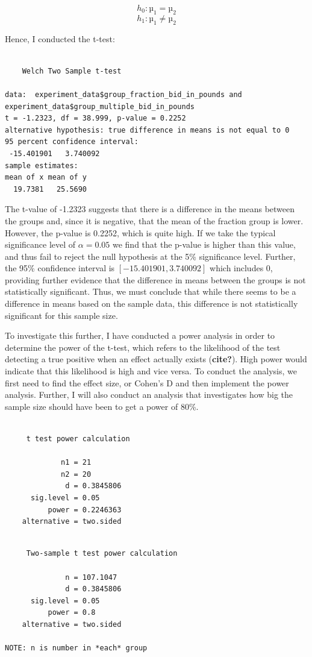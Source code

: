 \documentclass[
]{report}
\begin{document}
\[h_0: µ_1 = µ_2\] \[h_1: µ_1 ≠ µ_2\]

Hence, I conducted the t-test:

\begin{verbatim}

    Welch Two Sample t-test

data:  experiment_data$group_fraction_bid_in_pounds and experiment_data$group_multiple_bid_in_pounds
t = -1.2323, df = 38.999, p-value = 0.2252
alternative hypothesis: true difference in means is not equal to 0
95 percent confidence interval:
 -15.401901   3.740092
sample estimates:
mean of x mean of y 
  19.7381   25.5690 
\end{verbatim}

The t-value of -1.2323 suggests that there is a difference in the means
between the groups and, since it is negative, that the mean of the
fraction group is lower. However, the p-value is 0.2252, which is quite
high. If we take the typical significance level of \(α = 0.05\) we find
that the p-value is higher than this value, and thus fail to reject the
null hypothesis at the 5\% significance level. Further, the 95\%
confidence interval is \([-15.401901, 3.740092]\) which includes 0,
providing further evidence that the difference in means between the
groups is not statistically significant. Thus, we must conclude that
while there seems to be a difference in means based on the sample data,
this difference is not statistically significant for this sample size.

To investigate this further, I have conducted a power analysis in order
to determine the power of the t-test, which refers to the likelihood of
the test detecting a true positive when an effect actually exists
(\textbf{cite?}). High power would indicate that this likelihood is high
and vice versa. To conduct the analysis, we first need to find the
effect size, or Cohen's D and then implement the power analysis.
Further, I will also conduct an analysis that investigates how big the
sample size should have been to get a power of 80\%.

\begin{verbatim}

     t test power calculation 

             n1 = 21
             n2 = 20
              d = 0.3845806
      sig.level = 0.05
          power = 0.2246363
    alternative = two.sided
\end{verbatim}

\begin{verbatim}

     Two-sample t test power calculation 

              n = 107.1047
              d = 0.3845806
      sig.level = 0.05
          power = 0.8
    alternative = two.sided

NOTE: n is number in *each* group
\end{verbatim}
\end{document}
